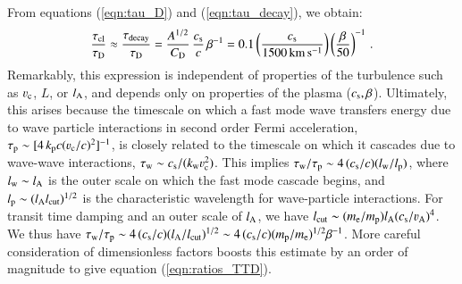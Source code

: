 \documentclass[fleqn,usenatbib,useAMS]{mnras}
\begin{document}
From equations (\ref{eqn:tau_D}) and (\ref{eqn:tau_decay}), we obtain:
\begin{equation}
  \frac{\tau_{\rm cl}}{\tau_{\rm D}} \approx \frac{\tau_{\rm decay}}{\tau_{\rm D}}
  = \frac{A^{1/2}}{C_{{\mathrm{D}}}}\,\frac{c_{\rm s}}{c}\,\beta^{-1}
  = 0.1 \left( \frac{c_{\rm s}}{1500 \, {\rm km \, s^{-1}}} \right) \left( \frac{\beta}{50} \right)^{-1}\,. 
\label{eqn:ratios_TTD} 
\end{equation}
Remarkably, this expression is independent of properties of the turbulence such as $\varv_{\rm c}$, $L$, or $l_{\rm A}$, and depends only on properties of the plasma ($c_{\rm s},\beta$). Ultimately, this arises because the timescale on which a fast mode wave transfers energy due to wave particle interactions in second order Fermi acceleration, $\tau_{\rm p} \sim [4\, k_{\rm p} c (\varv_{\rm c}/c)^{2} ]^{-1}$, is closely related to the timescale on which it cascades due to wave-wave interactions, $\tau_{\rm w} \sim c_{\rm s}/(k_{\rm w} \varv_{\rm c}^{2})$. This implies $\tau_{\rm w}/\tau_{\rm p} \sim 4\, (c_{\rm s}/c)(l_{\rm w}/l_{\rm p})$, where $l_{\rm w} \sim l_{\rm A}$ is the outer scale on which the fast mode cascade begins, and $l_{\rm p} \sim (l_{\rm A} l_{\rm cut})^{1/2}$ is the characteristic wavelength for wave-particle interactions. For transit time damping and an outer scale of $l_{\rm A}$, we have $l_{\rm cut} \sim (m_{\rm e}/m_{\rm p}) l_{\rm A} (c_{\rm s}/\varv_{\rm A})^{4}$. We thus have $\tau_{\rm w}/\tau_{\rm p} \sim 4\,(c_{\rm s}/c)(l_{\rm A}/l_{\rm cut})^{1/2} \sim 4\,(c_{\rm s}/c) (m_{\rm p}/m_{\rm e})^{1/2} \beta^{-1}$. More careful consideration of dimensionless factors boosts this estimate by an order of magnitude to give equation (\ref{eqn:ratios_TTD}). 
\end{document}
